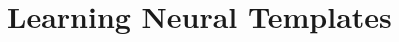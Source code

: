 \documentclass[aspectratio=169]{beamer}
\newcommand{\thetitle}[1]{{\begin{center}\textbf{{#1}}\end{center}}}
\begin{document}
\section{Learning Neural Templates}




{


}





\end{document}
